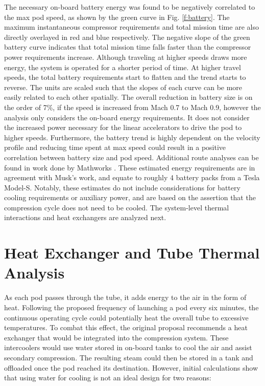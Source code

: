 \documentclass[heading.tex]{subfiles}
\begin{document}
The necessary on-board battery energy was found to be negatively correlated to the max pod speed,
as shown by the green curve in Fig. \ref{f:battery}.
The maximum instantaneous compressor requirements and total mission time
are also directly overlayed in red and blue respectively. 
The negative slope of the green battery curve indicates that total mission time falls
faster than the compressor power requirements increase.
Although traveling at higher speeds draws more energy, the system is operated for a shorter period of time.
At higher travel speeds, the total battery requirements start to flatten and the trend starts to reverse.
The units are scaled such that the slopes of each curve can be more easily related to each other spatially.
The overall reduction in battery size is on the order of 7\%, if the speed is increased from Mach 0.7 to Mach 0.9, 
however the analysis only considers the on-board energy requirements. It does not consider the increased power
necessary for the linear accelerators to drive the pod to higher speeds. 
Furthermore, the battery trend is highly dependent on the velocity profile
and reducing time spent at max speed could result in a positive correlation between battery size and pod speed.
Additional route analyses can be found in work done by Mathworks \cite{Rouleau}.
These estimated energy requirements are in agreement with Musk's work,
and equate to roughly 4 battery packs from a Tesla Model-S.
Notably, these estimates do not include considerations for battery cooling requirements or auxiliary power,
and are based on the assertion that the compression cycle does not need to be cooled.
The system-level thermal interactions and heat exchangers are analyzed next.

\section{Heat Exchanger and Tube Thermal Analysis}
\label{s:heatex}
As each pod passes through the tube, it adds energy to the air in the form of heat.
Following the proposed frequency of launching a pod every six minutes,
the continuous operating cycle could potentially heat the overall tube to excessive temperatures.
To combat this effect, the original proposal recommends a heat exchanger that would be integrated into the compression system.
These intercoolers would use water stored in on-board tanks to cool the air and assist secondary compression.
The resulting steam could then be stored in a tank and offloaded once the pod reached its destination.
However, initial calculations show that using water for cooling is not an ideal design for two reasons:
\end{document}
